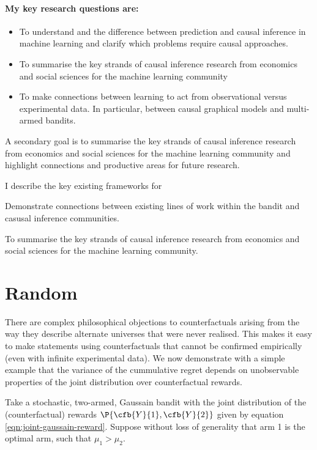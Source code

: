 \paragraph*{My key research questions are:} 
\begin{itemize}
\item To understand and the difference between prediction and causal inference in machine learning and clarify which problems require causal approaches.
\item To summarise the key strands of causal inference research from economics and social sciences for the machine learning community
\item To make connections between learning to act from observational versus experimental data. In particular, between causal graphical models and multi-armed bandits.
\end{itemize}



A secondary goal is to summarise the key strands of causal inference research from economics and social sciences for the machine learning community and highlight connections and productive areas for future research. 

I describe the key existing frameworks for 

Demonstrate connections between existing lines of work within the bandit and casusal inference communities. 

To summarise the key strands of causal inference research from economics and social sciences for the machine learning community.
\section{Random}

There are complex philosophical objections to counterfactuals arising from the way they describe alternate universes that were never realised. This makes it easy to make statements using counterfactuals that cannot be confirmed empirically (even with infinite experimental data). We now demonstrate with a simple example that the variance of the cummulative regret depends on unobservable properties of the joint distribution over counterfactual rewards. 

Take a stochastic, two-armed, Gaussain bandit with the joint distribution of the (counterfactual) rewards $\P{\cfb{Y}{1},\cfb{Y}{2}}$ given by equation \ref{eqn:joint-gaussain-reward}. Suppose without loss of generality that arm 1 is the optimal arm, such that $\mu_1 > \mu_2$. 

